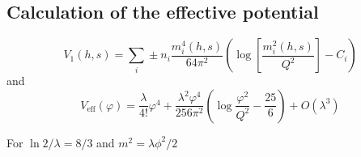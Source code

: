 \subsection{Calculation of the effective potential}
\begin{equation}
    V_1(h, s) = \sum_i \pm n_i \frac{m_i^4(h, s)}{64\pi^2} \left( \log \left[ \frac{m_i^2(h, s)}{Q^2} \right] - C_i \right)
\end{equation}
and 
\begin{equation}
    V_{\text{eff}}(\varphi) = \frac{\lambda}{4!}\varphi^4 + \frac{\lambda^2 \varphi^4}{256\pi^2} \left( \log \frac{\varphi^2}{Q^2} - \frac{25}{6} \right) + O(\lambda^3)
\end{equation}

For $\ln 2/\lambda =8/3$ and $m^2=\lambda\phi^2/2$